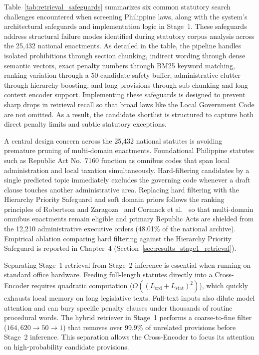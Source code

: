     Table~\ref{tab:retrieval_safeguards} summarizes six common statutory search challenges encountered when screening Philippine laws, along with the system's architectural safeguards and implementation logic in Stage~1. These safeguards address structural failure modes identified during statutory corpus analysis across the 25,432 national enactments. As detailed in the table, the pipeline handles isolated prohibitions through section chunking, indirect wording through dense semantic vectors, exact penalty numbers through BM25 keyword matching, ranking variation through a 50-candidate safety buffer, administrative clutter through hierarchy boosting, and long provisions through sub-chunking and long-context encoder support. Implementing these safeguards is designed to prevent sharp drops in retrieval recall so that broad laws like the Local Government Code are not omitted. As a result, the candidate shortlist is structured to capture both direct penalty limits and subtle statutory exceptions.

    A central design concern across the 25,432 national statutes is avoiding premature pruning of multi-domain enactments. Foundational Philippine statutes such as Republic Act No.~7160 function as omnibus codes that span local administration and local taxation simultaneously. Hard-filtering candidates by a single predicted topic immediately excludes the governing code whenever a draft clause touches another administrative area. Replacing hard filtering with the Hierarchy Priority Safeguard and soft domain priors follows the ranking principles of Robertson and Zaragoza~\cite{robertson2009probabilistic} and Cormack et al.~\cite{cormack2009reciprocal} so that multi-domain omnibus enactments remain eligible and primary Republic Acts are shielded from the 12,210 administrative executive orders (48.01\% of the national archive). Empirical ablation comparing hard filtering against the Hierarchy Priority Safeguard is reported in Chapter~4 (Section~\ref{sec:results_stage1_retrieval}).

    Separating Stage~1 retrieval from Stage~2 inference is essential when running on standard office hardware. Feeding full-length statutes directly into a Cross-Encoder requires quadratic computation ($O((L_{\text{ord}} + L_{\text{stat}})^2)$), which quickly exhausts local memory on long legislative texts. Full-text inputs also dilute model attention and can bury specific penalty clauses under thousands of routine procedural words. The hybrid retriever in Stage~1 performs a coarse-to-fine filter ($164{,}620 \rightarrow 50 \rightarrow 1$) that removes over 99.9\% of unrelated provisions before Stage~2 inference. This separation allows the Cross-Encoder to focus its attention on high-probability candidate provisions.

